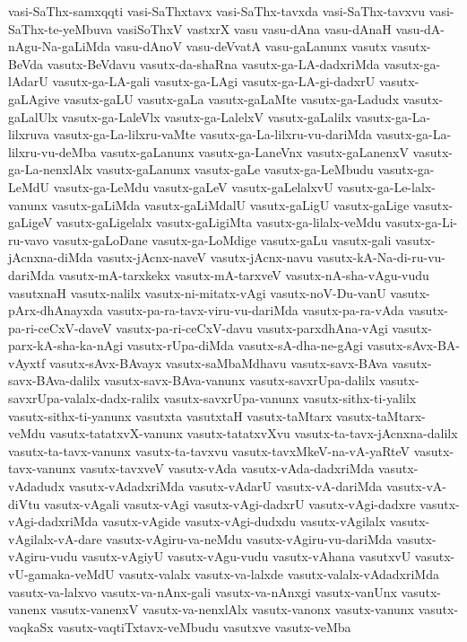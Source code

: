 {vasi-SaThx-samxqqti
vasi-SaThxtavx
vasi-SaThx-tavxda
vasi-SaThx-tavxvu
vasi-SaThx-te-yeMbuva
vasiSoThxV
vastxrX
vasu
vasu-dAna
vasu-dAnaH
vasu-dA-nAgu-Na-gaLiMda
vasu-dAnoV
vasu-deVvatA
vasu-gaLanunx
vasutx
vasutx-BeVda
vasutx-BeVdavu
vasutx-da-shaRna
vasutx-ga-LA-dadxriMda
vasutx-ga-lAdarU
vasutx-ga-LA-gali
vasutx-ga-LAgi
vasutx-ga-LA-gi-dadxrU
vasutx-gaLAgive
vasutx-gaLU
vasutx-gaLa
vasutx-gaLaMte
vasutx-ga-Ladudx
vasutx-gaLalUlx
vasutx-ga-LaleVlx
vasutx-ga-LalelxV
vasutx-gaLalilx
vasutx-ga-La-lilxruva
vasutx-ga-La-lilxru-vaMte
vasutx-ga-La-lilxru-vu-dariMda
vasutx-ga-La-lilxru-vu-deMba
vasutx-gaLanunx
vasutx-ga-LaneVnx
vasutx-gaLanenxV
vasutx-ga-La-nenxlAlx
vasutx-gaLanunx
vasutx-gaLe
vasutx-ga-LeMbudu
vasutx-ga-LeMdU
vasutx-ga-LeMdu
vasutx-gaLeV
vasutx-gaLelalxvU
vasutx-ga-Le-lalx-vanunx
vasutx-gaLiMda
vasutx-gaLiMdalU
vasutx-gaLigU
vasutx-gaLige
vasutx-gaLigeV
vasutx-gaLigelalx
vasutx-gaLigiMta
vasutx-ga-lilalx-veMdu
vasutx-ga-Li-ru-vavo
vasutx-gaLoDane
vasutx-ga-LoMdige
vasutx-gaLu
vasutx-gali
vasutx-jAcnxna-diMda
vasutx-jAcnx-naveV
vasutx-jAcnx-navu
vasutx-kA-Na-di-ru-vu-dariMda
vasutx-mA-tarxkekx
vasutx-mA-tarxveV
vasutx-nA-sha-vAgu-vudu
vasutxnaH
vasutx-nalilx
vasutx-ni-mitatx-vAgi
vasutx-noV-Du-vanU
vasutx-pArx-dhAnayxda
vasutx-pa-ra-tavx-viru-vu-dariMda
vasutx-pa-ra-vAda
vasutx-pa-ri-ceCxV-daveV
vasutx-pa-ri-ceCxV-davu
vasutx-parxdhAna-vAgi
vasutx-parx-kA-sha-ka-nAgi
vasutx-rUpa-diMda
vasutx-sA-dha-ne-gAgi
vasutx-sAvx-BA-vAyxtf
vasutx-sAvx-BAvayx
vasutx-saMbaMdhavu
vasutx-savx-BAva
vasutx-savx-BAva-dalilx
vasutx-savx-BAva-vanunx
vasutx-savxrUpa-dalilx
vasutx-savxrUpa-valalx-dadx-ralilx
vasutx-savxrUpa-vanunx
vasutx-sithx-ti-yalilx
vasutx-sithx-ti-yanunx
vasutxta
vasutxtaH
vasutx-taMtarx
vasutx-taMtarx-veMdu
vasutx-tatatxvX-vanunx
vasutx-tatatxvXvu
vasutx-ta-tavx-jAcnxna-dalilx
vasutx-ta-tavx-vanunx
vasutx-ta-tavxvu
vasutx-tavxMkeV-na-vA-yaRteV
vasutx-tavx-vanunx
vasutx-tavxveV
vasutx-vAda
vasutx-vAda-dadxriMda
vasutx-vAdadudx
vasutx-vAdadxriMda
vasutx-vAdarU
vasutx-vA-dariMda
vasutx-vA-diVtu
vasutx-vAgali
vasutx-vAgi
vasutx-vAgi-dadxrU
vasutx-vAgi-dadxre
vasutx-vAgi-dadxriMda
vasutx-vAgide
vasutx-vAgi-dudxdu
vasutx-vAgilalx
vasutx-vAgilalx-vA-dare
vasutx-vAgiru-va-neMdu
vasutx-vAgiru-vu-dariMda
vasutx-vAgiru-vudu
vasutx-vAgiyU
vasutx-vAgu-vudu
vasutx-vAhana
vasutxvU
vasutx-vU-gamaka-veMdU
vasutx-valalx
vasutx-va-lalxde
vasutx-valalx-vAdadxriMda
vasutx-va-lalxvo
vasutx-va-nAnx-gali
vasutx-va-nAnxgi
vasutx-vanUnx
vasutx-vanenx
vasutx-vanenxV
vasutx-va-nenxlAlx
vasutx-vanonx
vasutx-vanunx
vasutx-vaqkaSx
vasutx-vaqtiTxtavx-veMbudu
vasutxve
vasutx-veMba
}
